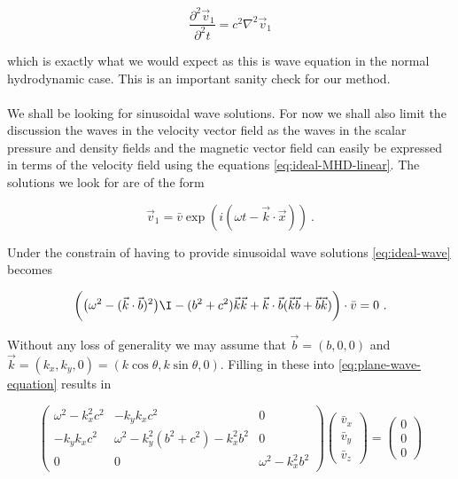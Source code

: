 $$ \frac{\partial^2 \vec{v}_1}{\partial^2 t} = c^2 \nabla^2 \vec{v}_1 $$

which is exactly what we would expect as this is wave equation in the normal hydrodynamic case. This is an important sanity check for our method.\\
\\

We shall be looking for sinusoidal wave solutions. For now we shall also limit the discussion the waves in the velocity vector field as the waves in the scalar pressure and density fields and the magnetic vector field can easily be expressed in terms of the velocity field using the equations \autoref{eq:ideal-MHD-linear}. The solutions we look for are of the form

$$ \vec{v}_1 = \bar{v} \exp(i(\omega t - \vec{k} \cdot \vec{x})) \ .$$ 

Under the constrain of having to provide sinusoidal wave solutions \autoref{eq:ideal-wave} becomes

\begin{equation}
\label{eq:plane-wave-equation}
\bigg( \big( \omega^2 - (\vec{k}\cdot \vec{b})^2 \big) \I - (b^2 + c^2)\vec{k}\vec{k} + \vec{k} \cdot \vec{b}(\vec{k}\vec{b} + \vec{b}\vec{k}) \bigg) \cdot \bar{v} = 0 \ .
\end{equation} 

Without any loss of generality we may assume that $\vec{b} = (b,0,0)$ and $\vec{k} = (k_x, k_y, 0) = (k\cos\theta, k\sin\theta, 0)$. Filling in these into \autoref{eq:plane-wave-equation} results in

\begin{equation}
\label{eq:plane-wave-equation-matrixform}
\begin{pmatrix}
 \omega^ 2-k_x^2 c^2  &  - k_y k_x c^2  & 0\\
- k_y k_x c^2  &  \omega^2  - k_y^2 (b^2 + c^2) - k_x^2 b^2  &  0\\
0  &  0  & \omega^2  -  k_x^2 b^2
\end{pmatrix}
\begin{pmatrix}
\bar{v}_x \\
\bar{v}_y \\
\bar{v}_z
\end{pmatrix}
 = 
\begin{pmatrix}
0 \\
0 \\
0
\end{pmatrix}
\end{equation} 

